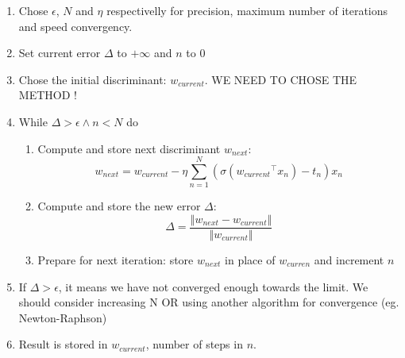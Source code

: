 \documentclass[a4paper, 10pt]{article}
\begin{document}
\begin{enumerate}
    \item Chose $\epsilon$, $N$ and $\eta$ respectivelly for precision, maximum number of iterations and speed convergency.
    \item Set current error $\Delta$ to $+\infty$ and $n$ to $0$
    \item Chose the initial discriminant: $w_{current}$. WE NEED TO CHOSE THE METHOD ! 
    \item While $\Delta > \epsilon \wedge n < N$ do
    \begin{enumerate}
        \item Compute and store next discriminant $w_{next}$:
$$
w_{next} = w_{current} - \eta \sum_{n=1}^{N}\left(\sigma({w_{current}}^\top x_n)-t_n\right)x_n
$$
        \item Compute and store the new error $\Delta$:
$$
\Delta = \frac{\left\Vert w_{next} - w_{current}\right\Vert}{\left\Vert w_{current} \right\Vert}
$$
        \item Prepare for next iteration: store $w_{next}$ in place of $w_{curren}$ and increment $n$
    \end{enumerate}
    \item If $\Delta > \epsilon$, it means we have not converged enough towards the limit. We should consider increasing N OR using another algorithm for convergence (eg. Newton-Raphson)
    \item Result is stored in $w_{current}$, number of steps in $n$. 
\end{enumerate}
\end{document}
